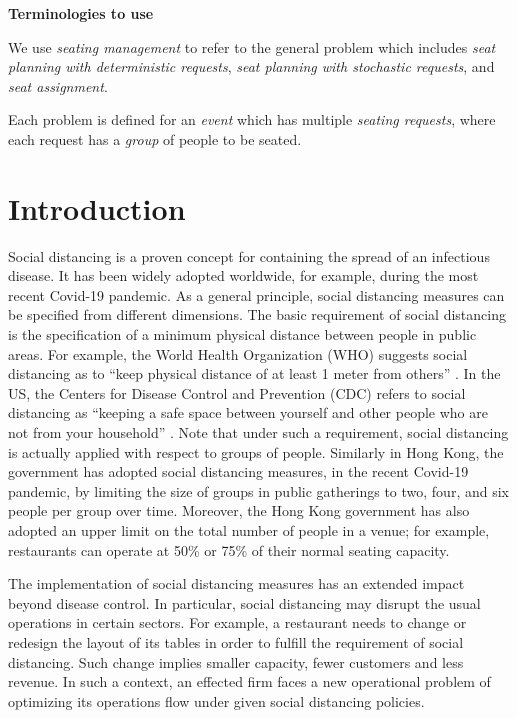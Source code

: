 
{\bf Terminologies to use}

We use {\em seating management} to refer to the general problem which includes {\em seat planning with deterministic requests}, 
{\em seat planning with stochastic requests}, and {\em seat assignment}.

Each problem is defined for an {\em event} which has multiple {\em seating requests}, where each request has a {\em group} of people to be seated.

\section{Introduction}
Social distancing is a proven concept for containing the spread of an infectious disease. It has been widely adopted worldwide, for example, during the most recent Covid-19 pandemic. As a general principle, social distancing measures can be specified from different dimensions. The basic requirement of social distancing is the specification of a minimum physical distance between people in public areas. For example, the World Health Organization (WHO) suggests social distancing as to ``keep physical distance of at least 1 meter from others'' \cite{AdviceforPublic}. In the US, the Centers for Disease Control and Prevention (CDC) refers to social distancing as ``keeping a safe space between yourself and other people who are not from your household'' \cite{CDC}. 
Note that under such a requirement, social distancing is actually applied with respect to groups of people. Similarly in Hong Kong, the government has adopted social distancing measures, in the recent Covid-19 pandemic, by limiting the size of groups in public gatherings to two, four, and six people per group over time. Moreover, the Hong Kong government has also adopted an upper limit on the total number of people in a venue; for example, restaurants can operate at 50\% or 75\% of their normal seating capacity. 

The implementation of social distancing measures has an extended impact beyond disease control. In particular, social distancing may disrupt the usual operations in certain sectors. For example, a restaurant needs to change or redesign the layout of its tables in order to fulfill the requirement of social distancing. Such change implies smaller capacity, fewer customers and less revenue. In such a context, an effected firm faces a new operational problem of optimizing its operations flow under given social distancing policies.

